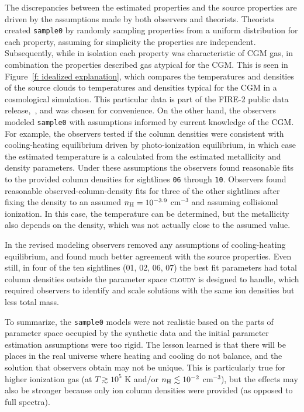 \documentclass[fleqn,usenatbib]{mnras}
\begin{document}
The discrepancies between the estimated properties and the source properties are driven by the assumptions made by both observers and theorists.
Theorists created \texttt{sample0} by randomly sampling properties from a uniform distribution for each property, assuming for simplicity the properties are independent.
Subsequently, while in isolation each property was characteristic of CGM gas, in combination the properties described gas atypical for the CGM.
This is seen in Figure~\ref{f: idealized explanation}, which compares the temperatures and densities of the source clouds to temperatures and densities typical for the CGM in a cosmological simulation.
This particular data is part of the FIRE-2 public data release,~\citealt{wetzel2022Public}, and was chosen for convenience.
On the other hand, the observers modeled \texttt{sample0} with assumptions informed by current knowledge of the CGM.
For example, the observers tested if the column densities were consistent with cooling-heating equilibrium driven by photo-ionization equilibrium, in which case the estimated temperature is a calculated from the estimated metallicity and density parameters.
Under these assumptions the observers found reasonable fits to the provided column densities for sightlines \texttt{06} through \texttt{10}.
Observers found reasonable observed-column-density fits for three of the other sightlines after fixing the density to an assumed $n_{\rm H} = 10^{-3.9}$ cm$^{-3}$ and assuming collisional ionization.
In this case, the temperature can be determined, but the metallicity also depends on the density,
which was not actually close to the assumed value.

In the revised modeling observers removed any assumptions of cooling-heating equilibrium, and found much better agreement with the source properties.
Even still, in four of the ten sightlines (\textsc{01}, \textsc{02}, \textsc{06}, \textsc{07}) the best fit parameters had total  column densities outside the parameter space \textsc{cloudy} is designed to handle, which required observers to identify and scale solutions with the same ion densities but less total mass.

To summarize, the \texttt{sample0} models were not realistic based on the parts of parameter space occupied by the synthetic data and the initial parameter estimation assumptions were too rigid.
The lesson learned is that there will be places in the real universe where heating and cooling do not balance, and the solution that observers obtain may not be unique.
This is particularly true for higher ionization gas (at $T \gtrsim 10^{5}$ K and/or $n_{\rm H} \lesssim 10^{-2}$ cm$^{-3}$),
but the effects may also be stronger because only ion column densities were provided (as opposed to full spectra).
\end{document}
